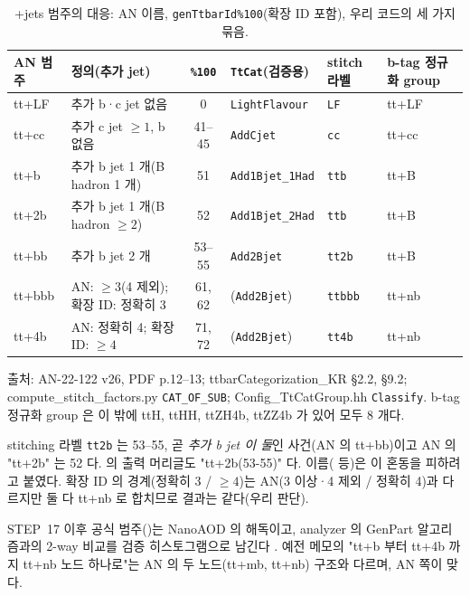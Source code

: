\begin{table}[htbp]
\centering
\caption{\ttbar+jets 범주의 대응: AN 이름, \texttt{genTtbarId\%100}(확장 ID 포함), 우리 코드의 세 가지 묶음.}
\label{tab:samples-cats}
\footnotesize
\begin{tabularx}{\textwidth}{l L c l l l}
\toprule
AN 범주 & 정의(추가 jet) & \texttt{\%100} & \texttt{TtCat}(검증용) & stitch 라벨 & b-tag 정규화 group \\
\midrule
tt+LF  & 추가 b·c jet 없음 & 0 & \texttt{LightFlavour} & \texttt{LF} & tt+LF \\
tt+cc  & 추가 c jet $\geq1$, b 없음 & 41--45 & \texttt{AddCjet} & \texttt{cc} & tt+cc \\
tt+b   & 추가 b jet 1 개(B hadron 1 개) & 51 & \texttt{Add1Bjet\_1Had} & \texttt{ttb} & tt+B \\
tt+2b  & 추가 b jet 1 개(B hadron $\geq2$) & 52 & \texttt{Add1Bjet\_2Had} & \texttt{ttb} & tt+B \\
tt+bb  & 추가 b jet 2 개 & 53--55 & \texttt{Add2Bjet} & \texttt{tt2b} & tt+B \\
tt+bbb & AN: $\geq3$(4 제외); 확장 ID: 정확히 3 & 61, 62 & (\texttt{Add2Bjet}) & \texttt{ttbbb} & tt+nb \\
tt+4b  & AN: 정확히 4; 확장 ID: $\geq4$ & 71, 72 & (\texttt{Add2Bjet}) & \texttt{tt4b} & tt+nb \\
\bottomrule
\end{tabularx}
\par\smallskip\footnotesize 출처: AN-22-122 v26, PDF p.12--13; ttbarCategorization\_KR §2.2, §9.2; compute\_stitch\_factors.py \texttt{CAT\_OF\_SUB}; Config\_TtCatGroup.hh \texttt{Classify}.
b-tag 정규화 group 은 이 밖에 ttH, ttHH, ttZH4b, ttZZ4b 가 있어 모두 8 개다.
\end{table}

\begin{note}[이름의 함정: "tt2b"]
stitching 라벨 \texttt{tt2b} 는 53--55, 곧 \emph{추가 b jet 이 둘}인 사건(AN 의 tt+bb)이고 AN 의 "tt+2b" 는 52 다.  의 출력 머리글도
"tt+2b(53-55)" 다.  이름( 등)은 이 혼동을 피하려고 붙였다. 확장 ID 의 경계(정확히 3 / $\geq4$)는
AN(3 이상·4 제외 / 정확히 4)과 다르지만 둘 다 tt+nb 로 합치므로 결과는 같다(우리 판단).
\end{note}

STEP~17 이후 공식 범주()는 NanoAOD  의 해독이고, analyzer 의 GenPart 알고리즘과의 2-way 비교를 검증 히스토그램으로 남긴다
. 예전 메모의 "tt+b 부터 tt+4b 까지 tt+nb 노드 하나로"는 AN 의 두 노드(tt+mb, tt+nb) 구조와 다르며, AN 쪽이 맞다.

